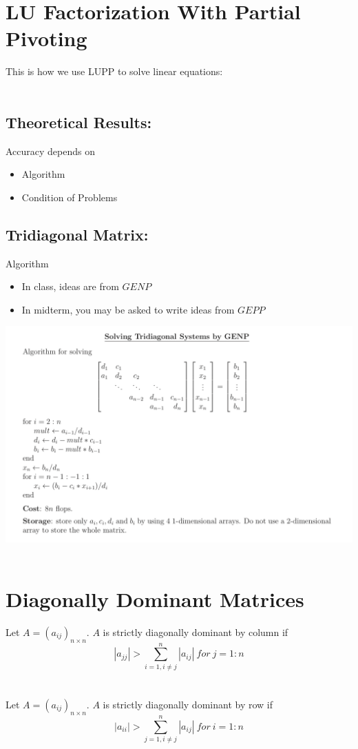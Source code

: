\documentclass [9 pt]{article}
\theoremstyle{definition}
\begin{document}
\newpage
\section*{LU Factorization With Partial Pivoting}


\newpage
This is how we use LUPP to solve linear equations:
\\
\\






\newpage
\subsection*{Theoretical Results:}
Accuracy depends on
\begin{itemize}
	\item Algorithm
	\item Condition of Problems
\end{itemize}


\subsection*{Tridiagonal Matrix:}
Algorithm
\begin{itemize}
	\item In class, ideas are from $GENP$
	\item In midterm, you may be asked to write ideas from $GEPP$
\end{itemize}
\includegraphics[scale = 0.5]{4.png}\\
\\
\section*{Diagonally Dominant Matrices}
Let $A = (a_{ij})_{n\times n}$. $A$ is strictly diagonally dominant by column if
$$ |a_{jj}| > \sum_{i = 1, i \neq j}^{n} |a_{ij}|\   for \ j = 1:n $$
\\
\\
Let $A = (a_{ij})_{n\times n}$. $A$ is strictly diagonally dominant by row if
$$ |a_{ii}| > \sum_{j = 1, i \neq j}^{n} |a_{ij}|\   for \ i = 1:n$$
\end{document}
